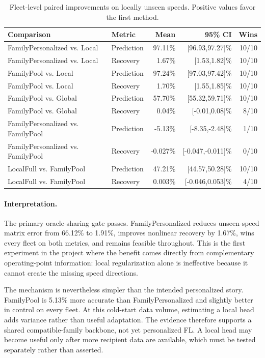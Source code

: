 \begin{table}[htbp]
\centering
\caption{Fleet-level paired improvements on locally unseen speeds. Positive
values favor the first method.}
\label{tab:experiment10b-comparisons}
\begin{tabular}{llrrr}
\toprule
Comparison & Metric & Mean & 95\% CI & Wins\\
\midrule
FamilyPersonalized vs. Local & Prediction & 97.11\% & [96.93,97.27]\% & 10/10\\
FamilyPersonalized vs. Local & Recovery & 1.67\% & [1.53,1.82]\% & 10/10\\
FamilyPool vs. Local & Prediction & 97.24\% & [97.03,97.42]\% & 10/10\\
FamilyPool vs. Local & Recovery & 1.70\% & [1.55,1.85]\% & 10/10\\
FamilyPool vs. Global & Prediction & 57.70\% & [55.32,59.71]\% & 10/10\\
FamilyPool vs. Global & Recovery & 0.04\% & [-0.01,0.08]\% & 8/10\\
FamilyPersonalized vs. FamilyPool & Prediction & -5.13\% & [-8.35,-2.48]\% & 1/10\\
FamilyPersonalized vs. FamilyPool & Recovery & -0.027\% & [-0.047,-0.011]\% & 0/10\\
LocalFull vs. FamilyPool & Prediction & 47.21\% & [44.57,50.28]\% & 10/10\\
LocalFull vs. FamilyPool & Recovery & 0.003\% & [-0.046,0.053]\% & 4/10\\
\bottomrule
\end{tabular}
\end{table}

\paragraph{Interpretation.}
The primary oracle-sharing gate passes. FamilyPersonalized reduces
unseen-speed matrix error from 66.12\% to 1.91\%, improves nonlinear recovery
by 1.67\%, wins every fleet on both metrics, and remains feasible throughout.
This is the first experiment in the project where the benefit comes directly
from complementary operating-point information: local regularization alone is
ineffective because it cannot create the missing speed directions.

The mechanism is nevertheless simpler than the intended personalized story.
FamilyPool is 5.13\% more accurate than FamilyPersonalized and slightly better
in control on every fleet. At this cold-start data volume, estimating a local
head adds variance rather than useful adaptation. The evidence therefore
supports a shared compatible-family backbone, not yet personalized FL. A local
head may become useful only after more recipient data are available, which must
be tested separately rather than asserted.

